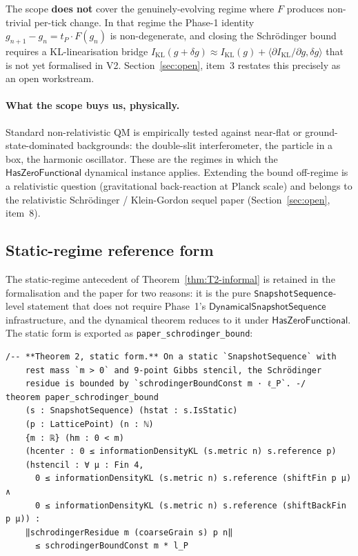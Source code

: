 \documentclass[11pt,a4paper,twoside]{article}
\theoremstyle{definition}
\newcommand{\KL}{I_{\mathrm{KL}}}
\newcommand{\tP}{t_P}
\newcommand{\HasZF}{\mathsf{HasZeroFunctional}}
\newcommand{\DynSeq}{\mathsf{DynamicalSnapshotSequence}}
\newcommand{\code}[1]{\texttt{#1}}
\begin{document}
The scope \textbf{does not} cover the genuinely-evolving regime where
$F$ produces non-trivial per-tick change. In that regime the Phase-1
identity $g_{n+1}-g_{n}=\tP\cdot F(g_{n})$ is non-degenerate, and
closing the Schr\"odinger bound requires a KL-linearisation bridge
$\KL(g+\delta g)\approx\KL(g)+\langle\partial\KL/\partial g,\delta g\rangle$
that is not yet formalised in V2. Section~\ref{sec:open}, item~3
restates this precisely as an open workstream.

\paragraph{What the scope buys us, physically.}
Standard non-relativistic QM is empirically tested against near-flat
or ground-state-dominated backgrounds: the double-slit interferometer,
the particle in a box, the harmonic oscillator. These are the regimes
in which the $\HasZF$ dynamical instance applies. Extending the bound
off-regime is a relativistic question (gravitational back-reaction at
Planck scale) and belongs to the relativistic Schr\"odinger /
Klein-Gordon sequel paper (Section~\ref{sec:open}, item~8).

\subsection{Static-regime reference form}\label{sec:T2-static}

The static-regime antecedent of Theorem~\ref{thm:T2-informal} is
retained in the formalisation and the paper for two reasons: it is
the pure \code{SnapshotSequence}-level statement that does not require
Phase~1's $\DynSeq$ infrastructure, and the dynamical theorem reduces
to it under $\HasZF$. The static form is exported as
\code{paper\_schrodinger\_bound}:
\begin{lstlisting}
/-- **Theorem 2, static form.** On a static `SnapshotSequence` with
    rest mass `m > 0` and 9-point Gibbs stencil, the Schrödinger
    residue is bounded by `schrodingerBoundConst m · ℓ_P`. -/
theorem paper_schrodinger_bound
    (s : SnapshotSequence) (hstat : s.IsStatic)
    (p : LatticePoint) (n : ℕ)
    {m : ℝ} (hm : 0 < m)
    (hcenter : 0 ≤ informationDensityKL (s.metric n) s.reference p)
    (hstencil : ∀ μ : Fin 4,
      0 ≤ informationDensityKL (s.metric n) s.reference (shiftFin p μ) ∧
      0 ≤ informationDensityKL (s.metric n) s.reference (shiftBackFin p μ)) :
    ‖schrodingerResidue m (coarseGrain s) p n‖
      ≤ schrodingerBoundConst m * l_P
\end{lstlisting}
\end{document}
